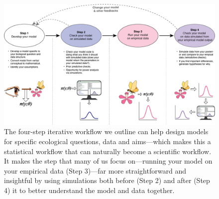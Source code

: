 \documentclass[11pt]{article}
\begin{document}
\newpage

\begin{figure}[ht]
\centering
\noindent \includegraphics[width=1\textwidth]{figures/workflow.png}
\caption{The four-step iterative workflow we outline can help design models for specific ecological questions, data and aims---which makes this a statistical workflow that can naturally become a scientific workflow. It makes the step that many of us focus on---running your model on your empirical data (Step 3)---far more straightforward and insightful by using simulations both before (Step 2) and after (Step 4) it to better understand the model and data together.}
\label{fig:workflow}
\end{figure}
\end{document}
